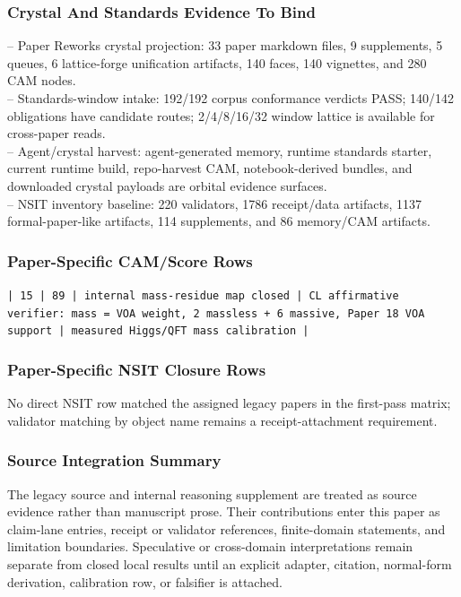 \documentclass[11pt]{article}
\begin{document}
\subsubsection*{Crystal And Standards Evidence To Bind}

\noindent{}-- Paper Reworks crystal projection: 33 paper markdown files, 9 supplements, 5 queues, 6 lattice-forge unification artifacts, 140 faces, 140 vignettes, and 280 CAM nodes.\\
\noindent{}-- Standards-window intake: 192/192 corpus conformance verdicts PASS; 140/142 obligations have candidate routes; 2/4/8/16/32 window lattice is available for cross-paper reads.\\
\noindent{}-- Agent/crystal harvest: agent-generated memory, runtime standards starter, current runtime build, repo-harvest CAM, notebook-derived bundles, and downloaded crystal payloads are orbital evidence surfaces.\\
\noindent{}-- NSIT inventory baseline: 220 validators, 1786 receipt/data artifacts, 1137 formal-paper-like artifacts, 114 supplements, and 86 memory/CAM artifacts.\\

\subsubsection*{Paper-Specific CAM/Score Rows}

\noindent\texttt{| 15 | 89 | internal mass-residue map closed | CL affirmative verifier: mass = VOA weight, 2 massless + 6 massive, Paper 18 VOA support | measured Higgs/QFT mass calibration |}\\

\subsubsection*{Paper-Specific NSIT Closure Rows}

No direct NSIT row matched the assigned legacy papers in the first-pass matrix; validator matching by object name remains a receipt-attachment requirement.

\subsubsection*{Source Integration Summary}

The legacy source and internal reasoning supplement are treated as source
evidence rather than manuscript prose. Their contributions enter this paper as
claim-lane entries, receipt or validator references, finite-domain statements,
and limitation boundaries. Speculative or cross-domain interpretations remain
separate from closed local results until an explicit adapter, citation,
normal-form derivation, calibration row, or falsifier is attached.
\end{document}
